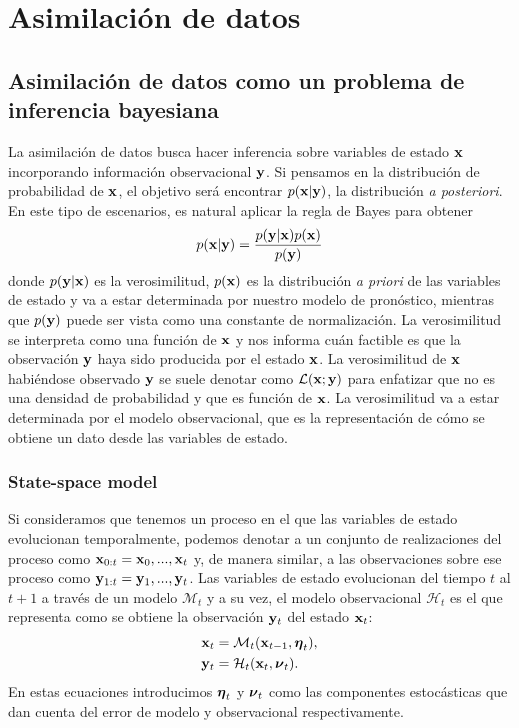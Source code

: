 \chapter{Asimilación de datos}

\section{Asimilación de datos como un problema de inferencia bayesiana}

La asimilación de datos busca hacer inferencia sobre variables de estado $\mathbf{x}$ incorporando información observacional $\mathbf{y}$. Si pensamos en la distribución de probabilidad de $\mathbf{x}$, el objetivo será encontrar $p(\mathbf{x} | \mathbf{y})$, la distribución \textit{a posteriori}. En este tipo de escenarios, es natural aplicar la regla de Bayes para obtener
\begin{align*}
    p(\mathbf{x} | \mathbf{y}) = \frac{p(\mathbf{y} | \mathbf{x})p(\mathbf{x})}{p(\mathbf{y})}
\end{align*}
donde $p(\mathbf{y} | \mathbf{x})$ es la verosimilitud, $p(\mathbf{x})$ es la distribución \textit{a priori} de las variables de estado y va a estar determinada por nuestro modelo de pronóstico, mientras que $p(\mathbf{y})$ puede ser vista como una constante de normalización. La verosimilitud se interpreta como una función de $\mathbf{x}$ y nos informa cuán factible es que la observación $\mathbf{y}$ haya sido producida por el estado $\mathbf{x}$. La verosimilitud de $\mathbf{x}$ habiéndose observado $\mathbf{y}$ se suele denotar como $\mathcal{L}(\mathbf{x} ; \mathbf{y})$ para enfatizar que no es una densidad de probabilidad y que es función de $\mathbf{x}$. La verosimilitud va a estar determinada por el modelo observacional, que es la representación de cómo se obtiene un dato desde las variables de estado.

\subsection{State-space model}

Si consideramos que tenemos un proceso en el que las variables de estado evolucionan temporalmente, podemos denotar a un conjunto de realizaciones del proceso como $\mathbf{x}_{0:t} = \mathbf{x}_0, ..., \mathbf{x}_t$ y, de manera similar, a las observaciones sobre ese proceso como $\mathbf{y}_{1:t} = \mathbf{y}_1, ..., \mathbf{y}_t$. Las variables de estado evolucionan del tiempo $t$ al $t+1$ a través de un modelo $\mathcal{M}_t$ y a su vez, el modelo observacional $\mathcal{H}_t$ es el que representa como se obtiene la observación $\mathbf{y}_t$ del estado $\mathbf{x}_t$: 
\begin{align}
    \mathbf{x}_t &= \mathcal M_{t} (\mathbf{x}_{t-1}, \mbox{\boldmath$ \eta $}_t), \label{eq:transition} \\
    \mathbf{y}_t &= \mathcal H_{t} (\mathbf{x}_t, \mbox{\boldmath$ \nu $}_t). \label{eq:observation}
\end{align}
En estas ecuaciones introducimos $\mbox{\boldmath$ \eta $}_t$ y $\mbox{\boldmath$ \nu $}_t$ como las componentes estocásticas que dan cuenta del error de modelo y observacional respectivamente.

